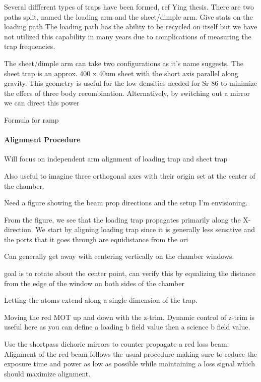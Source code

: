 Several diffferent types of traps have been formed, ref Ying thesis. There are two paths split, named the loading arm and the sheet/dimple arm. Give stats on the loading path The loading path has the ability to be recycled on itself but we have not utilized this capability in many years due to complications of measuring the trap frequencies. 

The sheet/dimple arm can take two configurations as it's name suggests. The sheet trap is an approx. 400 x 40um sheet with the short axis parallel along gravity. This geometry is useful for the low densities needed for Sr 86 to minimize the effecs of three body recombination. Alternatively, by switching out a mirror we can direct this power

Formula for ramp

\paragraph{Alignment Procedure} \label{sssec:1064_align}

Will focus on independent arm alignment of loading trap and sheet trap

Also useful to imagine three orthogonal axes with their origin set at the center of the chamber.

Need a figure showing the beam prop directions and the setup I'm envisioning.


From the figure, we see that the loading trap propagates primarily along the X-direction. We start by aligning loading trap since it is generally less sensitive and the ports that it goes through are equidistance from the ori

Can generally get away with centering vertically on the chamber windows. 

goal is to rotate about the center point, can verify this by equalizing the distance from the edge of the window on both sides of the chamber

Letting the atoms extend along a single dimension of the trap. 

Moving the red MOT up and down with the z-trim. Dynamic control of z-trim is useful here as you can define a loading b field value then a science b field value.

Use the shortpass dichoric mirrors to counter propagate a red loss beam. Alignment of the red beam follows the usual procedure making sure to reduce the exposure time and power as low as possible while maintaining a loss signal which should maximize alignment.

